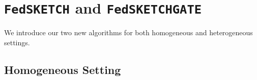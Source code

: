 \documentclass[11pt]{article}
\begin{document}
\vspace{-0.05in}
\section{\texttt{FedSKETCH} and \texttt{FedSKETCHGATE}}\label{sec:algos}
\vspace{-0.05in}
We introduce our two new algorithms for both homogeneous and heterogeneous settings.
\vspace{-0.05in}
\subsection{Homogeneous Setting}
\vspace{-0.05in}

\end{document}
